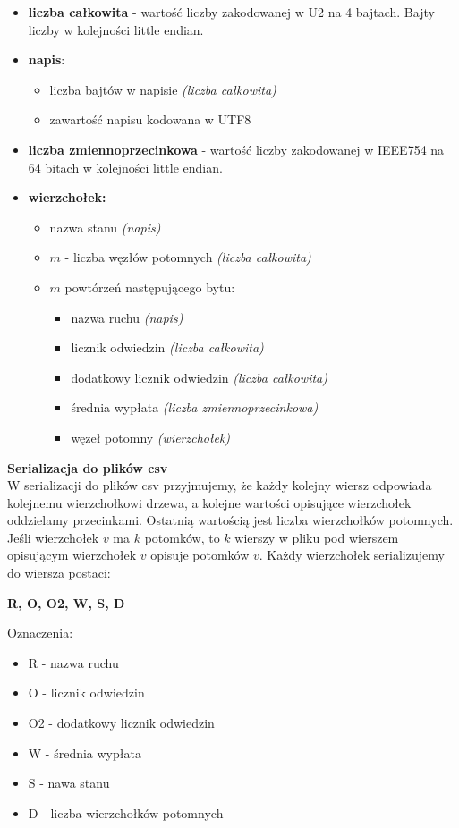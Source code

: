 \documentclass{article}
\begin{document}
	\begin{itemize}
		\item \textbf{liczba całkowita} - wartość liczby zakodowanej w U2 na 4 bajtach. Bajty liczby w kolejności little endian.
		\item \textbf{napis}:
		\begin{itemize}
			\item liczba bajtów w napisie \textit{(liczba całkowita)}
			\item zawartość napisu kodowana w UTF8
		\end{itemize}
		\item \textbf{liczba zmiennoprzecinkowa} - wartość liczby zakodowanej w IEEE754 na 64 bitach w kolejności little endian.
		\item \textbf{wierzchołek:}
		\begin{itemize}
			\item nazwa stanu \textit{(napis)}
			\item $m$ - liczba węzłów potomnych \textit{(liczba całkowita)}
			\item $m$ powtórzeń następującego bytu:
			\begin{itemize}
				\item nazwa ruchu \textit{(napis)}
				\item licznik odwiedzin \textit{(liczba całkowita)}
				\item dodatkowy licznik odwiedzin \textit{(liczba całkowita)}
				\item średnia wypłata \textit{(liczba zmiennoprzecinkowa)}
				\item węzeł potomny \textit{(wierzchołek)} \\
			\end{itemize}
		\end{itemize}
	\end{itemize}
	
	
	\noindent \textbf{\large Serializacja do plików csv} \\
	W serializacji do plików csv przyjmujemy, że każdy kolejny wiersz odpowiada kolejnemu wierzchołkowi drzewa, a kolejne wartości opisujące wierzchołek oddzielamy przecinkami. Ostatnią wartością jest liczba wierzchołków potomnych. Jeśli wierzchołek $v$ ma $k$ potomków, to $k$ wierszy w pliku pod wierszem opisującym wierzchołek $v$ opisuje potomków $v$. Każdy wierzchołek serializujemy do wiersza postaci:
	\begin{center}
		\textbf{R, O, O2, W, S, D}
	\end{center}
	Oznaczenia:
	\begin{itemize}
		\item R - nazwa ruchu
		\item O - licznik odwiedzin
		\item O2 - dodatkowy licznik odwiedzin
		\item W - średnia wypłata
		\item S - nawa stanu
		\item D - liczba wierzchołków potomnych
	\end{itemize}
	
\end{document}
